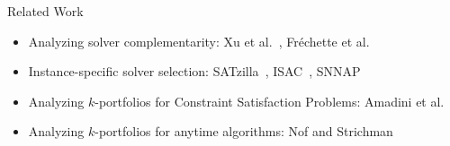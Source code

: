 \documentclass[en]{sdqbeamer}
\begin{document}
\begin{frame}[t]{Related Work}
	\begin{itemize}
		\item Analyzing solver complementarity: Xu et al.~\cite{Xu:2012:EvalContribVBS}, Fr{\'e}chette et al.~\cite{frechette2016using}
		\pause
		\vspace{\baselineskip}
		\item Instance-specific solver selection: SATzilla~\cite{xu2008satzilla, xu2012satzilla2012}, ISAC~\cite{Kadioglu:2010:ISAC}, SNNAP~\cite{Collautti:2013:SNNAP}
		\pause
		\vspace{\baselineskip}
		\item Analyzing $k$-portfolios for Constraint Satisfaction Problems: Amadini et al.~\cite{amadini2014empirical, amadini2016extensive}
		\pause
		\vspace{\baselineskip}
		\item Analyzing $k$-portfolios for anytime algorithms: Nof and Strichman~\cite{nof2020real}
	\end{itemize}
\end{frame}
\end{document}
